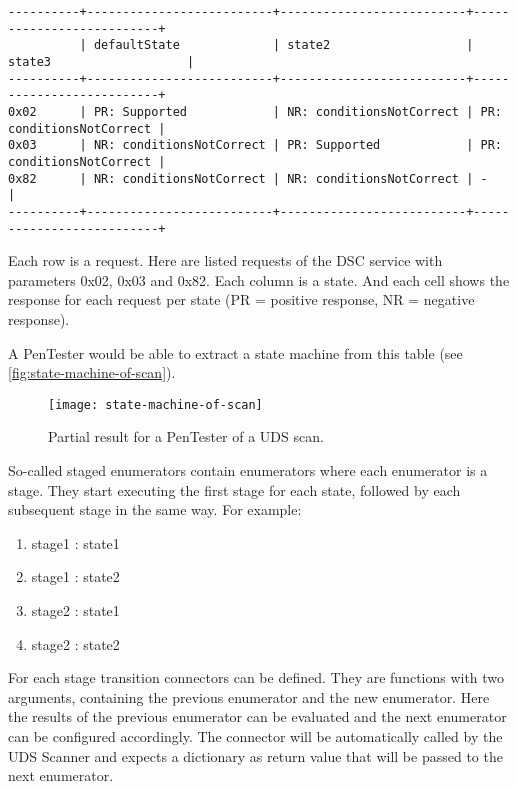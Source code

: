 \begin{samepage}
\begin{verbatim}
----------+--------------------------+--------------------------+--------------------------+
          | defaultState             | state2                   | state3                   | 
----------+--------------------------+--------------------------+--------------------------+
0x02      | PR: Supported            | NR: conditionsNotCorrect | PR: conditionsNotCorrect | 
0x03      | NR: conditionsNotCorrect | PR: Supported            | PR: conditionsNotCorrect | 
0x82      | NR: conditionsNotCorrect | NR: conditionsNotCorrect | -                        | 
----------+--------------------------+--------------------------+--------------------------+
\end{verbatim}
\end{samepage}

Each row is a request. Here are listed requests of the DSC service with parameters 0x02, 0x03 and 0x82. Each column is a state. And each cell shows the response for each request per state (PR = positive response, NR = negative response).

A PenTester would be able to extract a state machine from this table (see \autoref{fig:state-machine-of-scan}).

\begin{figure}[htb]
    \centering
    \texttt{[image: state-machine-of-scan]}
    \caption{Partial result for a PenTester of a UDS scan.}
    \label{fig:state-machine-of-scan}
\end{figure}

So-called staged enumerators contain enumerators where each enumerator is a stage. They start executing the first stage for each state, followed by each subsequent stage in the same way. For example:
\begin{enumerate}
    \item stage1 : state1
    \item stage1 : state2
    \item stage2 : state1
    \item stage2 : state2
\end{enumerate}

For each stage transition connectors can be defined. They are functions with two arguments, containing the previous enumerator and the new enumerator. Here the results of the previous enumerator can be evaluated and the next enumerator can be configured accordingly. The connector will be automatically called by the UDS Scanner and expects a dictionary as return value that will be passed to the next enumerator. 

